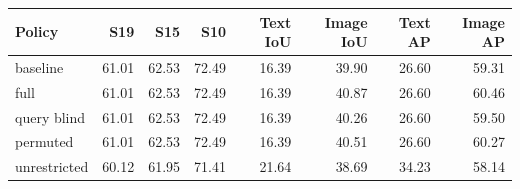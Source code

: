 \begin{tabular}{lrrrrrrr}
\toprule
Policy & S19 & S15 & S10 & Text IoU & Image IoU & Text AP & Image AP \\
\midrule
baseline & 61.01 & 62.53 & 72.49 & 16.39 & 39.90 & 26.60 & 59.31 \\
full & 61.01 & 62.53 & 72.49 & 16.39 & 40.87 & 26.60 & 60.46 \\
query blind & 61.01 & 62.53 & 72.49 & 16.39 & 40.26 & 26.60 & 59.50 \\
permuted & 61.01 & 62.53 & 72.49 & 16.39 & 40.51 & 26.60 & 60.27 \\
unrestricted & 60.12 & 61.95 & 71.41 & 21.64 & 38.69 & 34.23 & 58.14 \\
\bottomrule
\end{tabular}
